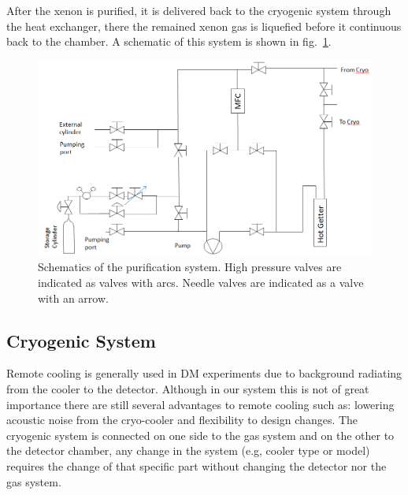 After the xenon is purified, it is delivered back to the cryogenic system through the heat exchanger, there the remained xenon gas is 
liquefied before it continuous back to the chamber. A schematic of this system is shown in fig.~\ref{fig:gasSchematic}.


\begin{figure}[t!]
\centerline{\includegraphics[width=1.\linewidth]{GasSchematics.png}}
\caption{Schematics of the purification system. High pressure valves are indicated as valves with arcs. Needle valves are indicated as 
a valve with an arrow.}
\label{fig:gasSchematic}
\end{figure}
\subsection{Cryogenic System}
\label{subsec:cryo}

Remote cooling is generally used in DM experiments due to background radiating from the cooler to the detector. Although in our system 
this is not of great importance there are still several advantages to remote cooling such as: lowering acoustic noise from the cryo-cooler 
and flexibility to design changes. The cryogenic system is connected on one side to the gas system and on the other to the detector chamber, 
any change in the system (e.g, cooler type or model) requires the change of that specific part without changing the detector nor the gas system.

